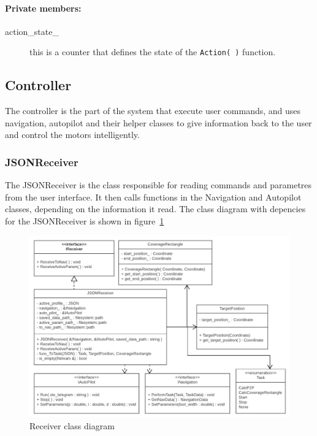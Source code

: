 \paragraph{Private members:}
\begin{adjustwidth}{2.5em}{0pt}\begin{description}
		\item [action_state_] this is a counter that defines the state of the \texttt{Action( )} function.
\end{description}\end{adjustwidth}



\subsection{Controller}

The controller is the part of the system that execute user commands, and uses navigation, autopilot and their helper classes to give information back to the user and control the motors intelligently.

\subsubsection{JSONReceiver}

The JSONReceiver is the class responsible for reading commands and parametres from the user interface. It then calls functions in the Navigation and Autopilot classes, depending on the information it read. The class diagram with depencies for the JSONReceiver is shown in figure~\ref{fig:Receiver}

\begin{figure}[H]
\centering
\includegraphics[width=1\linewidth]{Images/Design/Receiver_class_diagram}
\caption{Receiver class diagram}
\label{fig:Receiver}
\end{figure}

